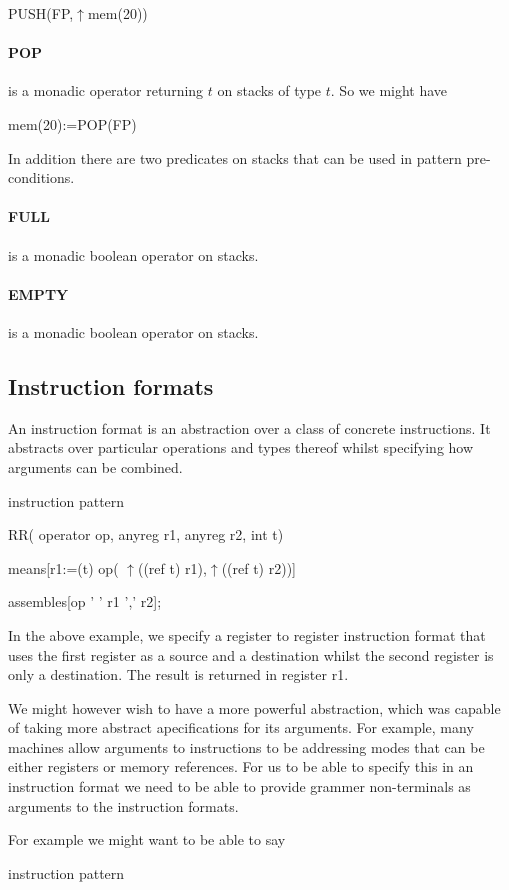 {{{PUSH(FP,$\uparrow$mem(20))
}

\paragraph{POP} is a monadic operator returning $t$ on stacks of type $t$. So we might have
{\bf

mem(20):=POP(FP)
} 
In addition there are two predicates on stacks that can be used in pattern pre-conditions.
\paragraph{FULL} is a monadic boolean operator on stacks.
\paragraph{EMPTY} is a monadic boolean operator on stacks.
\subsection{Instruction formats}

An instruction format is an abstraction over a class of concrete instructions.
It abstracts over particular operations
 and types thereof
whilst specifying how arguments can be combined.
{\bf

instruction pattern 

RR( operator op, anyreg r1, anyreg r2, int t)

        means[r1:=(t) op( $\uparrow$((ref t) r1),$\uparrow$((ref t) r2))]    

	assembles[op ' ' r1 ',' r2];


}
In the above example, we specify a register to register instruction format
that uses the first register as a source and a destination whilst the second
register is only a destination. The 
 result is returned in register r1.


We might however wish to have a more powerful abstraction, which was capable of
taking more abstract apecifications for its arguments. For example, many machines
allow arguments to instructions to be addressing modes that can be either
registers or memory references. For us to be able to specify this in an instruction
format we need to be able to provide grammer non-terminals as arguments
to the instruction formats.

For example we might want to be able to say

{\bf

instruction  pattern 

}}}
